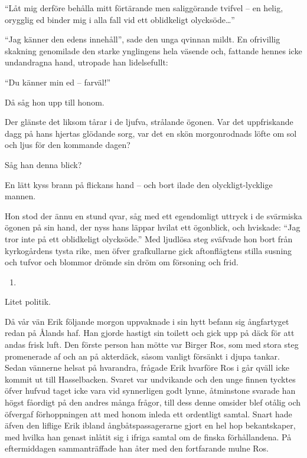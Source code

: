 ``Låt mig derföre behålla mitt förtärande men saliggörande tvifvel -- en
helig, orygglig ed binder mig i alla fall vid ett oblidkeligt
olycksöde\ldots{}''

``Jag känner den edens innehåll'', sade den unga qvinnan mildt. En
ofrivillig skakning genomilade den starke ynglingens hela väsende och,
fattande hennes icke undandragna hand, utropade han lidelsefullt:

``Du känner min ed -- farväl!''

Då såg hon upp till honom.

Der glänste det liksom tårar i de ljufva, strålande ögonen. Var det
uppfriskande dagg på hans hjertas glödande sorg, var det en skön
morgonrodnads löfte om sol och ljus för den kommande dagen?

Såg han denna blick?

En lätt kyss brann på flickans hand -- och bort ilade den
olyckligt-lycklige mannen.

Hon stod der ännu en stund qvar, såg med ett egendomligt uttryck i de
svärmiska ögonen på sin hand, der nyss hans läppar hvilat ett ögonblick,
och hviskade: ``Jag tror inte på ett oblidkeligt olycksöde.'' Med
ljudlösa steg sväfvade hon bort från kyrkogårdens tysta rike, men öfver
grafkullarne gick aftonflägtens stilla susning och tufvor och blommor
drömde sin dröm om försoning och frid.

\begin{enumerate}
\def\labelenumi{\arabic{enumi}.}
\setcounter{enumi}{3}
\tightlist
\item
\end{enumerate}

Litet politik.

Då vår vän Erik följande morgon uppvaknade i sin hytt befann sig
ångfartyget redan på Ålands haf. Han gjorde hastigt sin toilett och gick
upp på däck för att andas frisk luft. Den förste person han mötte var
Birger Ros, som med stora steg promenerade af och an på akterdäck, såsom
vanligt försänkt i djupa tankar. Sedan vännerne helsat på hvarandra,
frågade Erik hvarföre Ros i går qväll icke kommit ut till Hasselbacken.
Svaret var undvikande och den unge finnen tycktes öfver hufvud taget
icke vara vid synnerligen godt lynne, åtminstone svarade han högst
fåordigt på den andres många frågor, till dess denne omsider blef otålig
och öfvergaf förhoppningen att med honom inleda ett ordentligt samtal.
Snart hade äfven den liflige Erik ibland ångbåtspassagerarne gjort en
hel hop bekantskaper, med hvilka han genast inlåtit sig i ifriga samtal
om de finska förhållandena. På eftermiddagen sammanträffade han åter med
den fortfarande mulne Ros.

